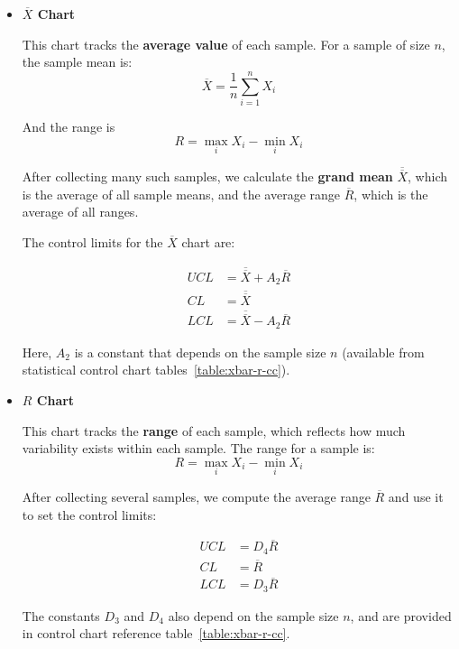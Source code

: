 \documentclass[twoside]{book}
\begin{document}
\begin{itemize}
\item \textbf{$\overline{X}$ Chart}

\medskip

This chart tracks the \textbf{average value} of each sample. For a sample of size $n$, the sample mean is:
\[
\overline{X} = \dfrac{1}{n} \sum_{i=1}^{n} X_i
\]

And the range is
$$R= \max_i X_i - \min_i X_i$$

After collecting many such samples, we calculate the \textbf{grand mean} $\overline{\overline{X}}$, which is the average of all sample means, and the average range $\overline{R}$, which is the average of all ranges.

The control limits for the $\overline{X}$ chart are:
\begin{textbox}
\begin{align*}
UCL &= \overline{\overline{X}} + A_2 \overline{R} \\
CL &= \overline{\overline{X}} \\
LCL &= \overline{\overline{X}} - A_2 \overline{R}
\end{align*}
\end{textbox}

Here, $A_2$ is a constant that depends on the sample size $n$ (available from statistical control chart tables~\ref{table:xbar-r-cc}).

\medskip

\item \textbf{$R$ Chart}

\medskip

This chart tracks the \textbf{range} of each sample, which reflects how much variability exists within each sample. The range for a sample is:
$$R= \max_i X_i - \min_i X_i$$

After collecting several samples, we compute the average range $\overline{R}$ and use it to set the control limits:
\begin{textbox}
\begin{align*}
UCL &= D_4 \overline{R} \\
CL &= \overline{R} \\
LCL &= D_3 \overline{R}
\end{align*}
\end{textbox}

The constants $D_3$ and $D_4$ also depend on the sample size $n$, and are provided in control chart reference table~\ref{table:xbar-r-cc}.
\end{itemize}
\end{document}
